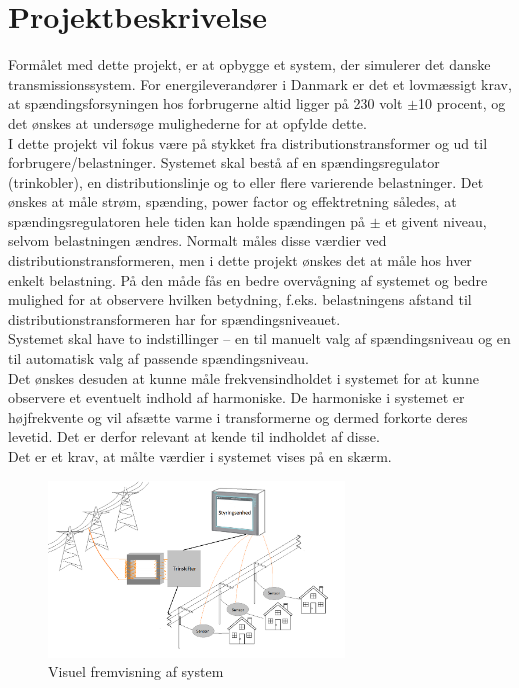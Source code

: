 
\chapter{Projektbeskrivelse}

Formålet med dette projekt, er at opbygge et system, der simulerer det danske transmissionssystem. For energileverandører i Danmark er det et lovmæssigt krav, at spændingsforsyningen hos forbrugerne altid ligger på 230 volt $\pm$10 procent, og det ønskes at undersøge mulighederne for at opfylde dette.\\ 
I dette projekt vil fokus være på stykket fra distributionstransformer og ud til forbrugere/belastninger. Systemet skal bestå af en spændingsregulator (trinkobler), en distributionslinje og to eller flere varierende belastninger. Det ønskes at måle strøm, spænding, power factor og effektretning således, at spændingsregulatoren hele tiden kan holde spændingen på $\pm$ et givent niveau, selvom belastningen ændres. Normalt måles disse værdier ved distributionstransformeren, men i dette projekt ønskes det at måle hos hver enkelt belastning. På den måde fås en bedre overvågning af systemet og bedre mulighed for at observere hvilken betydning, f.eks. belastningens afstand til distributionstransformeren har for spændingsniveauet.\\ Systemet skal have to indstillinger – en til manuelt valg af spændingsniveau og en til automatisk valg af passende spændingsniveau.\\ 
Det ønskes desuden at kunne måle frekvensindholdet i systemet for at kunne observere et eventuelt indhold af harmoniske. De harmoniske i systemet er højfrekvente og vil afsætte varme i transformerne og dermed forkorte deres levetid. Det er derfor relevant at kende til indholdet af disse.\\ 
Det er et krav, at målte værdier i systemet vises på en skærm. 

\begin{figure}[htbp] %
	\centering
	\includegraphics[width=0.7\textwidth]{Figure/RigtBillede}
	\caption{Visuel fremvisning af system}
	\label{fig:Rigtbillede}
\end{figure}